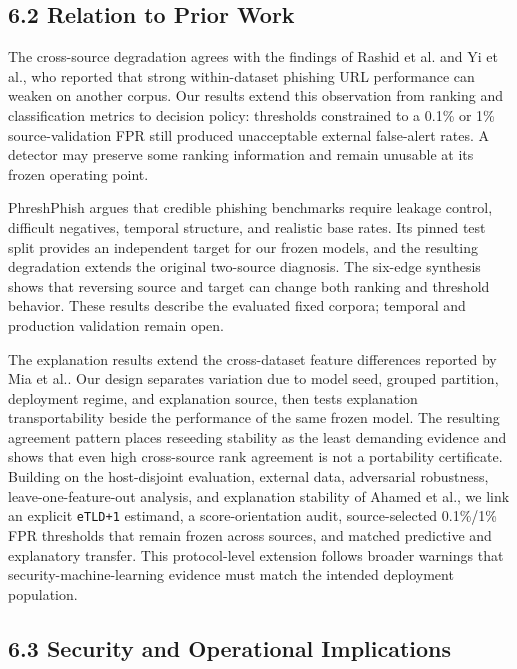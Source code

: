 \documentclass[
  10pt,
]{article}
\begin{document}
\subsection{6.2 Relation to Prior Work}\label{relation-to-prior-work}

The cross-source degradation agrees with the findings of Rashid et
al.\citep{Rashid2024} and Yi et al.\citep{Yi2026}, who reported that
strong within-dataset phishing URL performance can weaken on another
corpus. Our results extend this observation from ranking and
classification metrics to decision policy: thresholds constrained to a
0.1\% or 1\% source-validation FPR still produced unacceptable external
false-alert rates. A detector may preserve some ranking information and
remain unusable at its frozen operating point.

PhreshPhish argues that credible phishing benchmarks require leakage
control, difficult negatives, temporal structure, and realistic base
rates\citep{Dalton2025}. Its pinned test split provides an independent
target for our frozen models, and the resulting degradation extends the
original two-source diagnosis. The six-edge synthesis shows that
reversing source and target can change both ranking and threshold
behavior. These results describe the evaluated fixed corpora; temporal
and production validation remain open.

The explanation results extend the cross-dataset feature differences
reported by Mia et al.\citep{Mia2024}. Our design separates variation
due to model seed, grouped partition, deployment regime, and explanation
source, then tests explanation transportability beside the performance
of the same frozen model. The resulting agreement pattern places
reseeding stability as the least demanding evidence and shows that even
high cross-source rank agreement is not a portability certificate.
Building on the host-disjoint evaluation, external data, adversarial
robustness, leave-one-feature-out analysis, and explanation stability of
Ahamed et al.\citep{Ahamed2026}, we link an explicit \texttt{eTLD+1}
estimand, a score-orientation audit, source-selected 0.1\%/1\% FPR
thresholds that remain frozen across sources, and matched predictive and
explanatory transfer. This protocol-level extension follows broader
warnings that security-machine-learning evidence must match the intended
deployment population\citep{Arp2022, Pendlebury2019}.

\subsection{6.3 Security and Operational
Implications}\label{security-and-operational-implications}
\end{document}
